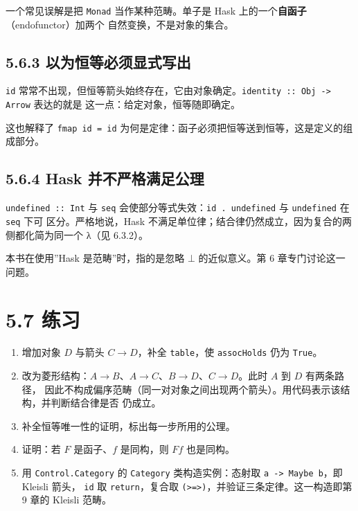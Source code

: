 一个常见误解是把 \passthrough{\lstinline!Monad!} 当作某种范畴。单子是 Hask 上的一个\textbf{自函子}（endofunctor）加两个
自然变换，不是对象的集合。

\subsection{5.6.3 以为恒等必须显式写出}\label{ux4ee5ux4e3aux6052ux7b49ux5fc5ux987bux663eux5f0fux5199ux51fa}

\passthrough{\lstinline!id!} 常常不出现，但恒等箭头始终存在，它由对象确定。\passthrough{\lstinline!identity :: Obj -> Arrow!} 表达的就是
这一点：给定对象，恒等随即确定。

这也解释了 \passthrough{\lstinline!fmap id = id!} 为何是定律：函子必须把恒等送到恒等，这是定义的组成部分。

\subsection{5.6.4 Hask 并不严格满足公理}\label{hask-ux5e76ux4e0dux4e25ux683cux6ee1ux8db3ux516cux7406}

\passthrough{\lstinline!undefined :: Int!} 与 \passthrough{\lstinline!seq!} 会使部分等式失效：\passthrough{\lstinline!id . undefined!} 与 \passthrough{\lstinline!undefined!} 在 \passthrough{\lstinline!seq!} 下可
区分。严格地说，Hask 不满足单位律；结合律仍然成立，因为复合的两侧都化简为同一个 λ（见 6.3.2）。

本书在使用''Hask 是范畴''时，指的是忽略 \(\bot\) 的近似意义。第 6 章专门讨论这一问题。

\section{5.7 练习}\label{ux7ec3ux4e60}

\begin{enumerate}
\def\labelenumi{\arabic{enumi}.}
\tightlist
\item
  增加对象 \(D\) 与箭头 \(C \to D\)，补全 \passthrough{\lstinline!table!}，使 \passthrough{\lstinline!assocHolds!} 仍为 \passthrough{\lstinline!True!}。
\item
  改为菱形结构：\(A \to B\)、\(A \to C\)、\(B \to D\)、\(C \to D\)。此时 \(A\) 到 \(D\) 有两条路径，
  因此不构成偏序范畴（同一对对象之间出现两个箭头）。用代码表示该结构，并判断结合律是否
  仍成立。
\item
  补全恒等唯一性的证明，标出每一步所用的公理。
\item
  证明：若 \(F\) 是函子、\(f\) 是同构，则 \(Ff\) 也是同构。
\item
  用 \passthrough{\lstinline!Control.Category!} 的 \passthrough{\lstinline!Category!} 类构造实例：态射取 \passthrough{\lstinline!a -> Maybe b!}，即 Kleisli 箭头，
  \passthrough{\lstinline!id!} 取 \passthrough{\lstinline!return!}，复合取 \passthrough{\lstinline!(>=>)!}，并验证三条定律。这一构造即第 9 章的 Kleisli 范畴。
\end{enumerate}

